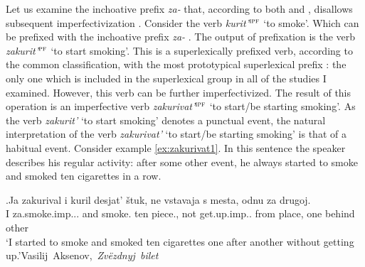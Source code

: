 Let us examine the inchoative  prefix \textit{za-}   that, according to both \citet[230]{Svenonius:04b} and \citet[116]{Tatevosov:09}, disallows subsequent imperfectivization . Consider the verb \textit{kurit'}$^{\textsc{ipf}}$ `to smoke'. Which can be prefixed with the inchoative  prefix {\textit{za-}  .} The output of prefixation  is the verb \textit{zakurit'}$^{\textsc{pf}}$ `to start smoking'. This is a superlexically prefixed verb, according to the common classification, with the most prototypical superlexical prefix : the only one which is included in the superlexical group in all of the studies I examined. However, this verb can be further imperfectivized. The result of this operation is an imperfective verb  \textit{zakurivat'}$^{\textsc{ipf}}$ `to start/be starting smoking'. As the verb \textit{zakurit'} `to start smoking' denotes a punctual event, the natural interpretation of the verb \textit{zakurivat'} `to start/be starting smoking'  is that of a habitual event. Consider example \ref{ex:zakurivat1}. In this sentence the speaker describes his regular activity: after some other event, he always started to smoke and smoked ten cigarettes in a row. 

\exg.\label{ex:zakurivat1}Ja zakurival i kuril desjat' \v{s}tuk, ne vstavaja s mesta, odnu za drugoj.\\
I za.smoke.imp... and smoke. ten piece., not get.up.imp.. from place, one behind other\\
\trans `I started to smoke and smoked ten cigarettes one after another without getting up.'\hbox{}\hfill\hbox{Vasilij Aksenov, \textit{Zv\"{e}zdnyj bilet}}

